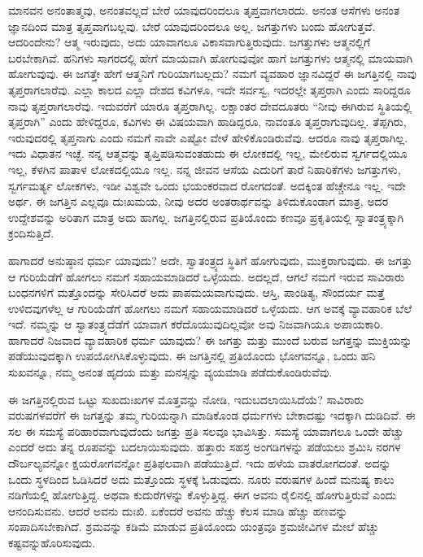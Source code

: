 \vskip 2pt

ಮಾನವನ ಅನಂತಾತ್ಮವು, ಅನಂತವಲ್ಲದೆ ಬೇರೆ ಯಾವುದರಿಂದಲೂ ತೃಪ್ತವಾಗಲಾರದು. ಅನಂತ ಆಸೆಗಳು ಅನಂತ ಜ್ಞಾನದಿಂದ ಮಾತ್ರ ತೃಪ್ತವಾಗಬಲ್ಲವು. ಬೇರೆ ಯಾವುದರಿಂದಲೂ ಅಲ್ಲ. ಜಗತ್ತುಗಳು ಬಂದು ಹೋಗುತ್ತವೆ. ಆದರಿಂದೇನು? ಆತ್ಮ ಇರುವುದು, ಅದು ಯಾವಾಗಲೂ ವಿಕಾಸವಾಗುತ್ತಿರುವುದು. ಜಗತ್ತುಗಳು ಆತ್ಮನಲ್ಲಿಗೆ ಬರಬೇಕಾಗಿವೆ. ಹನಿಗಳು ಸಾಗರದಲ್ಲಿ ಹೇಗೆ ಮಾಯವಾಗಿ ಹೋಗುವುವೋ ಹಾಗೆ ಜಗತ್ತುಗಳು ಆತ್ಮನಲ್ಲಿ ಮಾಯವಾಗಿ ಹೋಗುವುವು. ಈ ಜಗತ್ತೇ ಹೇಗೆ ಆತ್ಮನಿಗೆ ಗುರಿಯಾಗಬಲ್ಲದು? ನಮಗೆ ವ್ಯವಹಾರ ಜ್ಞಾನವಿದ್ದರೆ ಈ ಜಗತ್ತಿನಲ್ಲಿ ನಾವು ತೃಪ್ತರಾಗಲಾರೆವು. ಎಲ್ಲಾ ಕಾಲದ ಎಲ್ಲಾ ದೇಶದ ಕವಿಗಳೂ, ಇದೇ ಸರ್ವಸ್ವ, ಇದರಲ್ಲೇ ತೃಪ್ತರಾಗಿ ಎಂದು ಸಾರಿದ್ದರೂ ನಾವು ತೃಪ್ತರಾಗಲಾರೆವು. ಇದುವರೆಗೆ ಯಾರೂ ತೃಪ್ತರಾಗಿಲ್ಲ. ಲಕ್ಷಾಂತರ ದೇವದೂತರು “ನೀವು ಈಗಿರುವ ಸ್ಥಿತಿಯಲ್ಲಿ ತೃಪ್ತರಾಗಿ” ಎಂದು ಹೇಳಿದ್ದರೂ, ಕವಿಗಳು ಈ ವಿಷಯವಾಗಿ ಹಾಡಿದ್ದರೂ, ನಾವಂತೂ ತೃಪ್ತರಾಗುವುದಿಲ್ಲ. ತೆಪ್ಪಗಿರು, ಇರುವುದರಲ್ಲಿ ತೃಪ್ತನಾಗು ಎಂದು ನಮಗೆ ನಾವೇ ಎಷ್ಟೋ ವೇಳೆ ಹೇಳಿಕೊಂಡಿರುವೆವು. ಆದರೂ ನಾವು ತೃಪ್ತರಾಗಿಲ್ಲ. ಇದು ವಿಧಾತನ ಇಚ್ಛೆ. ನನ್ನ ಆತ್ಮವನ್ನು ತೃಪ್ತಿಪಡಿಸುವಂತಹುದು ಈ ಲೋಕದಲ್ಲಿ ಇಲ್ಲ, ಮೇಲಿರುವ ಸ್ವರ್ಗದಲ್ಲಿಯೂ ಇಲ್ಲ, ಕೆಳಗಿನ ಪಾತಾಳ ಲೋಕದಲ್ಲಿಯೂ ಇಲ್ಲ. ನನ್ನ ಜೀವನ ಆಸೆಯ ಎದುರಿಗೆ ತಾರೆ ನಿಹಾರಿಕೆಗಳು ಜಗತ್ತುಗಳು, ಸ್ವರ್ಗಮರ್ತ್ಯ ಲೋಕಗಳು, ಇಡೀ ವಿಶ್ವವೇ ಒಂದು ಭಯಂಕರವಾದ ರೋಗದಂತೆ. ಅದಕ್ಕಿಂತ ಹೆಚ್ಚೇನೂ ಇಲ್ಲ. ಇದೇ ಅರ್ಥ. ಈ ಜಗತ್ತಿನ ಎಲ್ಲವೂ ದುಃಖಮಯ, ನೀವು ಅದರ ಅಂತರಾರ್ಥವನ್ನು ತಿಳಿದುಕೊಂಡಾಗ ಮಾತ್ರ, ಅದರ ಉದ್ದೇಶವನ್ನು ಅರಿತಾಗ ಮಾತ್ರ ಅದು ಹಾಗಲ್ಲ. ಜಗತ್ತಿನಲ್ಲಿರುವ ಪ್ರತಿಯೊಂದು ಕಣವೂ ಪ್ರಕೃತಿಯಲ್ಲಿ ಸ್ವಾತಂತ್ರ್ಯಕ್ಕಾಗಿ ಕ್ರಂದಿಸುತ್ತಿದೆ.

\vskip 2pt

ಹಾಗಾದರೆ ಅನುಷ್ಠಾನ ಧರ್ಮ ಯಾವುದು? ಅದೇ, ಸ್ವಾತಂತ್ರ್ಯದ ಸ್ಥಿತಿಗೆ ಹೋಗುವುದು, ಮುಕ್ತರಾಗುವುದು. ಈ ಜಗತ್ತು ಆ ಗುರಿಯೆಡೆಗೆ ಹೋಗಲು ನಮಗೆ ಸಹಾಯಮಾಡಿದರೆ ಒಳ್ಳೆಯದು. ಅದಲ್ಲದೆ, ಆಗಲೆ ನಮಗೆ ಇರುವ ಸಾವಿರಾರು ಬಂಧನಗಳಿಗೆ ಮತ್ತೊಂದನ್ನು ಸೇರಿಸಿದರೆ ಅದು ಪಾಪಮಯವಾಗುವುದು. ಆಸ್ತಿ, ಪಾಂಡಿತ್ಯ, ಸೌಂದರ್ಯ ಮತ್ತೆ ಉಳಿದವುಗಳೆಲ್ಲ ಆ ಗುರಿಯೆಡೆಗೆ ಹೋಗಲು ನಮಗೆ ಸಹಾಯಮಾಡಿದರೆ ಒಳ್ಳೆಯದು. ಆಗ ಅವಕ್ಕೆ ವ್ಯಾವಹಾರಿಕ ಬೆಲೆ ಇದೆ. ನಮ್ಮನ್ನು ಆ ಸ್ವಾತಂತ್ರ್ಯದೆಡೆಗೆ ಯಾವಾಗ ಕರೆದೊಯುವುದಿಲ್ಲವೋ ಅವು ನಿಜವಾಗಿಯೂ ಅಪಾಯಕಾರಿ. ಹಾಗಾದರೆ ನಿಜವಾದ ವ್ಯಾವಹಾರಿಕ ಧರ್ಮ ಯಾವುದು? ಈ ಜಗತ್ತು ಮತ್ತು ಮುಂದೆ ಬರುವ ಜಗತ್ತನ್ನು ಮುಕ್ತಿಯನ್ನು ಪಡೆಯುವುದಕ್ಕಾಗಿ ಉಪಯೋಗಿಸಿಕೊಳ್ಳುವುದು. ಈ ಜಗತ್ತಿನಲ್ಲಿ ಪ್ರತಿಯೊಂದು ಭೋಗವನ್ನೂ, ಒಂದು ಹನಿ ಸುಖವನ್ನೂ, ನಮ್ಮ ಅನಂತ ಹೃದಯ ಮತ್ತು ಮನಸ್ಸನ್ನು ವ್ಯಯಮಾಡಿ ಪಡೆದುಕೊಂಡಿರುವೆವು.

\vskip 2pt

ಈ ಜಗತ್ತಿನಲ್ಲಿರುವ ಒಟ್ಟು ಸುಖದುಃಖಗಳ ಮೊತ್ತವನ್ನು ನೋಡಿ, ಇದು\break ಬದಲಾಯಿಸಿದೆಯೆ? ಸಾವಿರಾರು ವರುಷಗಳವರೆಗೆ ಈ ಜಗತ್ತನ್ನು ತಮ್ಮ ಗುರಿಯನ್ನಾಗಿ ಮಾಡಿಕೊಂಡ ಧರ್ಮಗಳು ಬೇಕಾದಷ್ಟು ಇದಕ್ಕಾಗಿ ದುಡಿದಿವೆ. ಈ ಸಲ ಈ ಸಮಸ್ಯೆ ಪರಿಹಾರವಾಗುವುದೆಂದು ಜಗತ್ತು ಪ್ರತಿ ಸಲವೂ ಭಾವಿಸಿತ್ತು. ಸಮಸ್ಯೆ ಯಾವಾಗಲೂ ಒಂದೇ ಹೆಚ್ಚು ಎಂದರೆ ಅದು ತನ್ನ ರೂಪವನ್ನು ಬದಲಾಯಿಸುವುದು. ಹತ್ತಾರು ಸಹಸ್ರ ಅಂಗಡಿಗಳನ್ನು ಪಡೆಯಲು ಶ್ರಮಿಸಿ ನರಗಳ ದೌರ್ಬಲ್ಯವನ್ನೋ ಕ್ಷಯರೋಗವನ್ನೋ ಪ್ರತಿಫಲವಾಗಿ ಪಡೆಯುತ್ತಿದೆ. ಇದು ಹಳೆಯ ವಾತರೋಗದಂತೆ. ಅದನ್ನು ಒಂದು ಸ್ಥಳದಿಂದ ಓಡಿಸಿದರೆ ಅದು ಮತ್ತೊಂದು ಸ್ಥಳಕ್ಕೆ ಓಡುವುದು. ನೂರು ವರುಷಗಳ ಹಿಂದೆ ಮನುಷ್ಯ ಕಾಲು ನಡಿಗೆಯಲ್ಲಿ ಹೋಗುತ್ತಿದ್ದ. ಅಥವಾ ಕುದುರೆಗಳನ್ನು ಕೊಳ್ಳುತ್ತಿದ್ದ. ಈಗ ಅವನು ರೈಲಿನಲ್ಲಿ ಹೋಗುತ್ತಿರುವೆ ಎಂದು ಆನಂದಿಸುವನು. ಆದರೆ ಅವನು ದುಃಖಿ. ಏಕೆಂದರೆ ಅವನು ಹೆಚ್ಚು ಕೆಲಸ ಮಾಡಿ ಹೆಚ್ಚು ಹಣವನ್ನು ಸಂಪಾದಿಸಬೇಕಾಗಿದೆ. ಶ್ರಮವನ್ನು ಕಡಿಮೆ ಮಾಡುವ ಪ್ರತಿಯೊಂದು ಯಂತ್ರವೂ ಶ್ರಮಜೀವಿಗಳ ಮೇಲೆ ಹೆಚ್ಚು ಕಷ್ಟವನ್ನು\break ಹೊರಿಸುವುದು.

